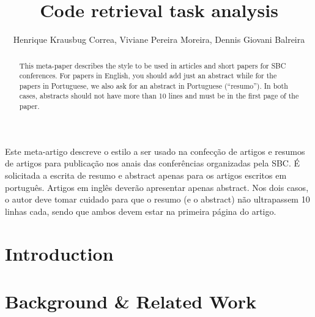 \documentclass[12pt]{article}
\title{Code retrieval task analysis}
\author{Henrique Krausbug Correa\inst{1}, Viviane Pereira Moreira\inst{1}, Dennis Giovani Balreira\inst{1}}
\begin{document}
 

\maketitle

\begin{abstract}
  This meta-paper describes the style to be used in articles and short papers
  for SBC conferences. For papers in English, you should add just an abstract
  while for the papers in Portuguese, we also ask for an abstract in
  Portuguese (``resumo''). In both cases, abstracts should not have more than
  10 lines and must be in the first page of the paper.
\end{abstract}
     
\begin{resumo} 
  Este meta-artigo descreve o estilo a ser usado na confecção de artigos e
  resumos de artigos para publicação nos anais das conferências organizadas
  pela SBC. É solicitada a escrita de resumo e abstract apenas para os artigos
  escritos em português. Artigos em inglês deverão apresentar apenas abstract.
  Nos dois casos, o autor deve tomar cuidado para que o resumo (e o abstract)
  não ultrapassem 10 linhas cada, sendo que ambos devem estar na primeira
  página do artigo.
\end{resumo}

\section{Introduction}





\section{Background \& Related Work}




\end{document}
